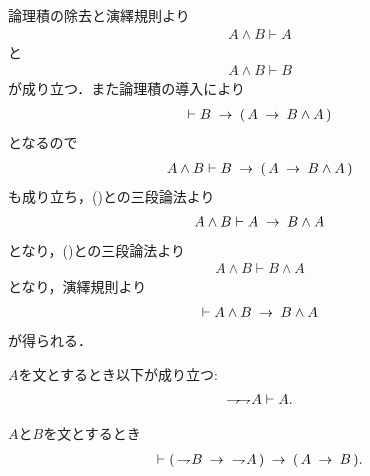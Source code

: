 	\begin{prf}
		論理積の除去と演繹規則より
		\begin{align}
			A \wedge B \vdash A
			\label{fom:logicalthm_commutative_law_of_conjunction_1}
		\end{align}
		と
		\begin{align}
			A \wedge B \vdash B
			\label{fom:logicalthm_commutative_law_of_conjunction_2}
		\end{align}
		が成り立つ．また論理積の導入により
		\begin{align}
			\vdash B \hspace{0.25em}\rightarrow\hspace{0.25em} (\, A \hspace{0.25em}\rightarrow\hspace{0.25em} B \wedge A\, )
		\end{align}
		となるので
		\begin{align}
			A \wedge B \vdash B \hspace{0.25em}\rightarrow\hspace{0.25em} (\, A \hspace{0.25em}\rightarrow\hspace{0.25em} B \wedge A\, )
		\end{align}
		も成り立ち，()との三段論法より
		\begin{align}
			A \wedge B \vdash A \hspace{0.25em}\rightarrow\hspace{0.25em} B \wedge A
		\end{align}
		となり，()との三段論法より
		\begin{align}
			A \wedge B \vdash B \wedge A
		\end{align}
		となり，演繹規則より
		\begin{align}
			\vdash A \wedge B \hspace{0.25em}\rightarrow\hspace{0.25em} B \wedge A
		\end{align}
		が得られる．
		\QED
	\end{prf}
	
	\begin{screen}
		\begin{logicalaxm}[二重否定の除去]
		\label{logicalaxm:elimination_of_double_negation}
			$A$を文とするとき以下が成り立つ:
			\begin{align}
				\rightharpoondown\hspace{-0.25em} \rightharpoondown\hspace{-0.25em} A \vdash A.
			\end{align}
		\end{logicalaxm}
	\end{screen}
	
	\begin{screen}
		\begin{logicalthm}[対偶論法の原理]
		\label{logicalthm:proof_by_contraposition}
			$A$と$B$を文とするとき
			\begin{align}
				\vdash (\, \rightharpoondown\hspace{-0.25em} B \hspace{0.25em}\rightarrow\hspace{0.25em}\ \rightharpoondown\hspace{-0.25em} A\, )
				\hspace{0.25em}\rightarrow\hspace{0.25em} (\, A \hspace{0.25em}\rightarrow\hspace{0.25em} B\, ).
			\end{align}
		\end{logicalthm}
	\end{screen}
	
